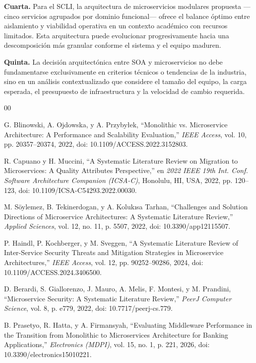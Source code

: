 \documentclass[10pt,twocolumn,letterpaper]{article}
\begin{document}
\textbf{Cuarta.} Para el SCLI, la arquitectura de microservicios modulares propuesta ---cinco servicios agrupados por dominio funcional--- ofrece el balance óptimo entre aislamiento y viabilidad operativa en un contexto académico con recursos limitados. Esta arquitectura puede evolucionar progresivamente hacia una descomposición más granular conforme el sistema y el equipo maduren.

\textbf{Quinta.} La decisión arquitectónica entre SOA y microservicios no debe fundamentarse exclusivamente en criterios técnicos o tendencias de la industria, sino en un análisis contextualizado que considere el tamaño del equipo, la carga esperada, el presupuesto de infraestructura y la velocidad de cambio requerida.

\begin{thebibliography}{00}

 G. Blinowski, A. Ojdowska, y A. Przyby\l{}ek, ``Monolithic vs. Microservice Architecture: A Performance and Scalability Evaluation,'' \textit{IEEE Access}, vol. 10, pp. 20357--20374, 2022, doi: 10.1109/ACCESS.2022.3152803.

 R. Capuano y H. Muccini, ``A Systematic Literature Review on Migration to Microservices: A Quality Attributes Perspective,'' en \textit{2022 IEEE 19th Int. Conf. Software Architecture Companion (ICSA-C)}, Honolulu, HI, USA, 2022, pp. 120--123, doi: 10.1109/ICSA-C54293.2022.00030.

 M. S\"oylemez, B. Tekinerdogan, y A. Koluk\i{}sa Tarhan, ``Challenges and Solution Directions of Microservice Architectures: A Systematic Literature Review,'' \textit{Applied Sciences}, vol. 12, no. 11, p. 5507, 2022, doi: 10.3390/app12115507.

 P. Haindl, P. Kochberger, y M. Sveggen, ``A Systematic Literature Review of Inter-Service Security Threats and Mitigation Strategies in Microservice Architectures,'' \textit{IEEE Access}, vol. 12, pp. 90252--90286, 2024, doi: 10.1109/ACCESS.2024.3406500.

 D. Berardi, S. Giallorenzo, J. Mauro, A. Melis, F. Montesi, y M. Prandini, ``Microservice Security: A Systematic Literature Review,'' \textit{PeerJ Computer Science}, vol. 8, p. e779, 2022, doi: 10.7717/peerj-cs.779.

 B. Prasetyo, R. Hatta, y A. Firmansyah, ``Evaluating Middleware Performance in the Transition from Monolithic to Microservices Architecture for Banking Applications,'' \textit{Electronics (MDPI)}, vol. 15, no. 1, p. 221, 2026, doi: 10.3390/electronics15010221.

\end{thebibliography}
\end{document}
